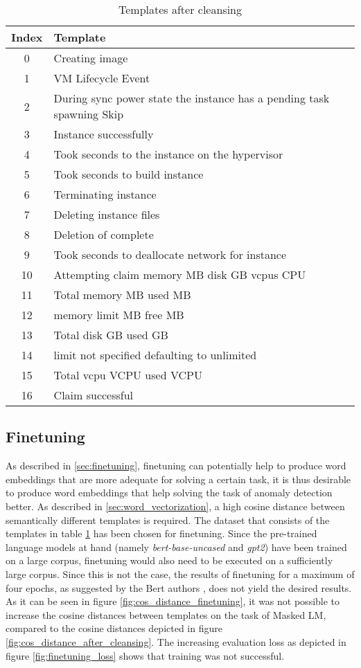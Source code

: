 \begin{table}[ht]
\begin{small}
\begin{tabular}{ c l } 
\toprule
Index & Template \\
\midrule
0 & Creating image\\
1 & VM  Lifecycle Event\\
2 & During sync power state the instance has a pending task spawning Skip\\
3 & Instance  successfully\\
4 & Took  seconds to  the instance on the hypervisor\\
5 & Took  seconds to build instance\\
6 & Terminating instance\\
7 & Deleting instance files\\
8 & Deletion of complete\\
9 & Took  seconds to deallocate network for instance\\
10 & Attempting claim memory  MB disk  GB vcpus  CPU\\
11 & Total memory  MB used  MB\\
12 & memory limit  MB free  MB\\
13 & Total disk  GB used  GB\\
14 & limit not specified defaulting to unlimited\\
15 & Total vcpu  VCPU used  VCPU\\
16 & Claim successful\\
\bottomrule
\end{tabular}
\caption{Templates after cleansing}
\label{tab:templates_after_cleansing}
\end{small}
\end{table}

\subsection{Finetuning}
As described in \ref{sec:finetuning}, finetuning can potentially help to produce word embeddings that are more adequate for solving a certain task, it is thus desirable to produce word embeddings that help solving the task of anomaly detection better. As described in \ref{sec:word_vectorization}, a high cosine distance between semantically different templates is required. The dataset that consists of the templates in table \ref{tab:templates_after_cleansing} has been chosen for finetuning. Since the pre-trained language models at hand (namely \textit{bert-base-uncased} and \textit{gpt2}) have been trained on a large corpus, finetuning would also need to be executed on a sufficiently large corpus. Since this is not the case, the results of finetuning for a maximum of four epochs, as suggested by the Bert authors \cite{devlin2018bert}, does not yield the desired results. As it can be seen in figure \ref{fig:cos_distance_finetuning}, it was not possible to increase the cosine distances between templates on the task of Masked LM, compared to the cosine distances depicted in figure \ref{fig:cos_distance_after_cleansing}. The increasing evaluation loss as depicted in figure \ref{fig:finetuning_loss} shows that training was not successful.

